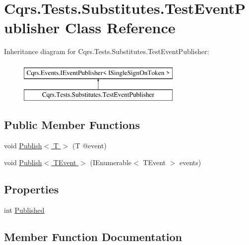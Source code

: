 \hypertarget{classCqrs_1_1Tests_1_1Substitutes_1_1TestEventPublisher}{}\section{Cqrs.\+Tests.\+Substitutes.\+Test\+Event\+Publisher Class Reference}
\label{classCqrs_1_1Tests_1_1Substitutes_1_1TestEventPublisher}
Inheritance diagram for Cqrs.\+Tests.\+Substitutes.\+Test\+Event\+Publisher\+:\begin{figure}[H]
\begin{center}
\leavevmode
\includegraphics[height=2.000000cm]{classCqrs_1_1Tests_1_1Substitutes_1_1TestEventPublisher}
\end{center}
\end{figure}
\subsection*{Public Member Functions}
\begin{DoxyCompactItemize}
\item 
void \hyperlink{classCqrs_1_1Tests_1_1Substitutes_1_1TestEventPublisher_a4a2b02804dc0afae8286aefc83a04f37_a4a2b02804dc0afae8286aefc83a04f37}{Publish$<$ T $>$} (T @event)
\item 
void \hyperlink{classCqrs_1_1Tests_1_1Substitutes_1_1TestEventPublisher_adbfefbd0acaa4f7a89344f54871f3943_adbfefbd0acaa4f7a89344f54871f3943}{Publish$<$ T\+Event $>$} (I\+Enumerable$<$ T\+Event $>$ events)
\end{DoxyCompactItemize}
\subsection*{Properties}
\begin{DoxyCompactItemize}
\item 
int \hyperlink{classCqrs_1_1Tests_1_1Substitutes_1_1TestEventPublisher_ab4004d3927bdc8133f690b68a81b9d0c_ab4004d3927bdc8133f690b68a81b9d0c}{Published}
\end{DoxyCompactItemize}


\subsection{Member Function Documentation}
\mbox{\label{classCqrs_1_1Tests_1_1Substitutes_1_1TestEventPublisher_a4a2b02804dc0afae8286aefc83a04f37_a4a2b02804dc0afae8286aefc83a04f37}} 
